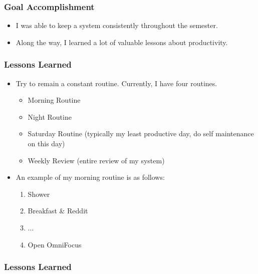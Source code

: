 \documentclass[xclolor=dvipsnames]{beamer}            %
\begin{document}
\begin{darkframes}
    \begin{frame}
        \frametitle{Goal Accomplishment}

        \begin{itemize}
            \item I was able to keep a system consistently throughout the semester.
            \item Along the way, I learned a lot of valuable lessons about productivity.
        \end{itemize}
    \end{frame}


    \begin{frame}
        \frametitle{Lessons Learned}

        \begin{itemize}
            \item Try to remain a constant routine. Currently, I have four routines.
                \begin{itemize}
                    \item Morning Routine
                    \item Night Routine
                    \item Saturday Routine (typically my least productive day, do self maintenance on this day)
                    \item Weekly Review (entire review of my system)
                \end{itemize}

            \item An example of my morning routine is as follows:
                \begin{enumerate}
                    \item Shower
                    \item Breakfast & Reddit
                    \item $\ldots$
                    \item Open OmniFocus
                \end{enumerate}
        \end{itemize}

    \end{frame}

    \begin{frame}
        \frametitle{Lessons Learned}


\end{frame}
\end{darkframes}
\end{document}
